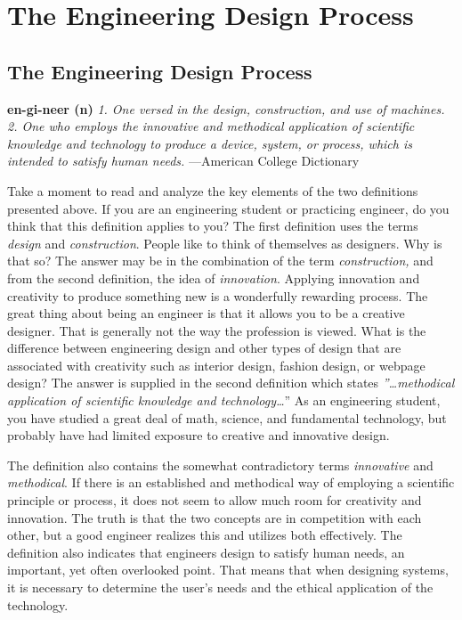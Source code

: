 
\chapter{The Engineering Design Process}
\section{The Engineering Design Process}
\graphicspath{ {./chapter01/Fig} }

\begin{itquote}
\textbf{en-gi-neer (n)} 
\textit{1. One versed in the design, construction, and
use of machines. 2. One who employs the innovative and methodical
application of scientific knowledge and technology to produce a device,
system, or process, which is intended to satisfy human needs.} ---American College Dictionary
\end{itquote}

Take a moment to read and analyze the key elements of the two
definitions presented above. If you are an engineering student or
practicing engineer, do you think that this definition applies to you?
The first definition uses the terms \emph{design} and
\emph{construction}. People like to think of themselves as designers.
Why is that so? The answer may be in the combination of the term
\emph{construction,} and from the second definition, the idea of
\emph{innovation}. Applying innovation and creativity to produce
something new is a wonderfully rewarding process. The great thing about
being an engineer is that it allows you to be a creative designer. That
is generally not the way the profession is viewed. What is the
difference between engineering design and other types of design that are
associated with creativity such as interior design, fashion design, or
webpage design? The answer is supplied in the second definition which
states \emph{''\ldots methodical application of scientific knowledge and
technology\ldots{}}'' As an engineering student, you have studied a
great deal of math, science, and fundamental technology, but probably
have had limited exposure to creative and innovative design.

The definition also contains the somewhat contradictory terms
\emph{innovative} and \emph{methodical}. If there is an established and
methodical way of employing a scientific principle or process, it does
not seem to allow much room for creativity and innovation. The truth is
that the two concepts are in competition with each other, but a good
engineer realizes this and utilizes both effectively. The definition
also indicates that engineers design to satisfy human needs, an
important, yet often overlooked point. That means that when designing
systems, it is necessary to determine the user's needs and the ethical
application of the technology.

